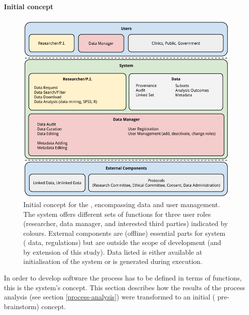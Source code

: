 
\paragraph{Initial concept}

\begin{figure}[h]
	\centering
	\includegraphics[width=1.0\linewidth]{images/brainstorm-before}
	\caption{
		Initial concept for the \ivfsystem{}, encompassing data and user management. 
		The system offers different sets of functions for three user roles (researcher, data manager, and interested third parties) indicated by colours. 
		External components are (offline) essential parts for system (\eg{} data, regulations) but are outside the scope of development (and by extension of this study).
		Data listed is either available at initialisation of the system or is generated during execution.
	}
	\label{fig:brainstorm-before}
\end{figure}

\noindent
In order to develop software the process has to be defined in terms of functions, this is the system's concept.
This section describes how the results of the process analysis (see section \ref{process-analysis}) were transformed to an initial (\ie{} pre-brainstorm) concept.

